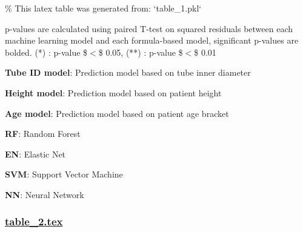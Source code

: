 \documentclass[11pt]{article}
\begin{document}
\begin{codeoutput}
\% This latex table was generated from: `table\_1.pkl`
\begin{table}[h]
\caption{Comparison of p-values between machine learning models and formula-based models}
\label{table:compare\_pvalues}
\begin{threeparttable}
\renewcommand{\TPTminimum}{\linewidth}
\begin{tablenotes}
\footnotesize
\item p-values are calculated using paired T-test on squared residuals between each machine learning model and each formula-based model, significant p-values are bolded. (*) : p-value \$$<$\$ 0.05, (**) : p-value \$$<$\$ 0.01
\item \textbf{Tube ID model}: Prediction model based on tube inner diameter
\item \textbf{Height model}: Prediction model based on patient height
\item \textbf{Age model}: Prediction model based on patient age bracket
\item \textbf{RF}: Random Forest
\item \textbf{EN}: Elastic Net
\item \textbf{SVM}: Support Vector Machine
\item \textbf{NN}: Neural Network
\end{tablenotes}
\end{threeparttable}
\end{table}
\end{codeoutput}

\subsubsection*{\hyperlink{code-LaTeX Table Design-table-2-tex}{table\_2.tex}}
\end{document}
